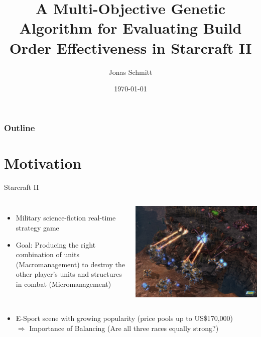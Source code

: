 \documentclass{beamer}
\title{A Multi-Objective Genetic Algorithm for Evaluating Build Order Effectiveness in Starcraft II} %
\author{Jonas Schmitt} %
\date{\today} %
\begin{document}
\begin{frame}
\titlepage %
\end{frame}

\begin{frame}
\frametitle{Outline} %
\tableofcontents %
\end{frame}
\section{Motivation}
\begin{frame}{Starcraft II}
\begin{columns}[c] %
    \begin{itemize}
		\item Military science-fiction real-time strategy game
		\item \alert{Goal:} Producing the right combination of units (\alert{Macromanagement}) to destroy the other player's units and structures in combat (\alert{Micromanagement})
	\end{itemize}
    	\includegraphics[width=1.0\linewidth]{starcraft-2-screenshot.jpg}
\end{columns}
\begin{itemize}
\item E-Sport scene with growing popularity (price pools up to US\$170,000)
\\ $\Rightarrow$ Importance of \alert{Balancing} (Are all three races equally strong?) 
\end{itemize}
\end{frame}
\end{document}
